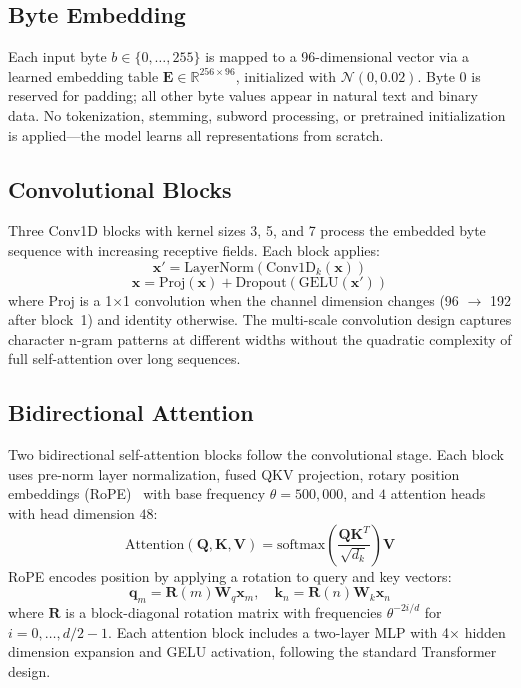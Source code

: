 \documentclass[11pt,a4paper]{article}
\begin{document}
\subsection{Byte Embedding}
Each input byte $b \in \{0,\dots,255\}$ is mapped to a 96-dimensional vector via a learned embedding table $\mathbf{E} \in \mathbb{R}^{256 \times 96}$, initialized with $\mathcal{N}(0, 0.02)$.
Byte 0 is reserved for padding; all other byte values appear in natural text and binary data.
No tokenization, stemming, subword processing, or pretrained initialization is applied---the model learns all representations from scratch.

\subsection{Convolutional Blocks}
Three Conv1D blocks with kernel sizes 3, 5, and 7 process the embedded byte sequence with increasing receptive fields.
Each block applies:
\begin{equation}
\mathbf{x}' = \text{LayerNorm}(\text{Conv1D}_k(\mathbf{x}))
\end{equation}
\begin{equation}
\mathbf{x} = \text{Proj}(\mathbf{x}) + \text{Dropout}(\text{GELU}(\mathbf{x}'))
\end{equation}
where $\text{Proj}$ is a 1$\times$1 convolution when the channel dimension changes (96 $\to$ 192 after block~1) and identity otherwise.
The multi-scale convolution design captures character n-gram patterns at different widths without the quadratic complexity of full self-attention over long sequences.

\subsection{Bidirectional Attention}
Two bidirectional self-attention blocks follow the convolutional stage.
Each block uses pre-norm layer normalization, fused QKV projection, rotary position embeddings (RoPE)~\cite{rope} with base frequency $\theta = 500{,}000$, and $4$ attention heads with head dimension $48$:
\begin{equation}
\text{Attention}(\mathbf{Q},\mathbf{K},\mathbf{V}) = \text{softmax}\left(\frac{\mathbf{Q}\mathbf{K}^T}{\sqrt{d_k}}\right)\mathbf{V}
\end{equation}
RoPE encodes position by applying a rotation to query and key vectors:
\begin{equation}
\mathbf{q}_m = \mathbf{R}(m)\mathbf{W}_q\mathbf{x}_m,\quad
\mathbf{k}_n = \mathbf{R}(n)\mathbf{W}_k\mathbf{x}_n
\end{equation}
where $\mathbf{R}$ is a block-diagonal rotation matrix with frequencies $\theta^{-2i/d}$ for $i = 0,\dots,d/2-1$.
Each attention block includes a two-layer MLP with 4$\times$ hidden dimension expansion and GELU activation, following the standard Transformer design.
\end{document}
